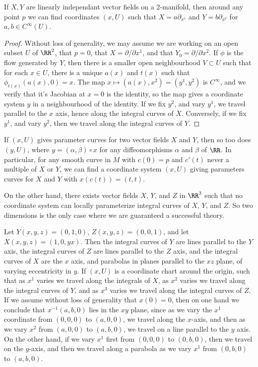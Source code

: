 \begin{theorem}
    If $X,Y$ are linearly independant vector fields on a 2-manifold, then around any point $p$ we can find coordinates $(x,U)$ such that $X = a \partial_{x^1}$ and $Y = b \partial_{x^2}$ for $a,b \in C^\infty(U)$.
\end{theorem}
\begin{proof}
    Without loss of generality, we may assume we are working on an open subset $U$ of $\RR^2$, that $p = 0$, that $X = \partial/\partial x^1$, and that $Y_0 = \partial / \partial x^2$. If $\phi$ is the flow generated by $Y$, then there is a smaller open neighbourhood $V \subset U$ such that for each $x \in U$, there is a unique $a(x)$ and $t(x)$ such that $\phi_{t(x)}(a(x),0) = x$. The map $x \mapsto (a(x),x^2) = (y^1,y^2)$ is $C^\infty$, and we verify that it's Jacobian at $x = 0$ is the identity, so the map gives a coordinate system $y$ in a neighbourhood of the identity. If we fix $y^2$, and vary $y^1$, we travel parallel to the $x$ axis, hence along the integral curves of $X$. Conversely, if we fix $y^1$, and vary $y^2$, then we travel along the integral curves of $Y$.
\end{proof}

\begin{remark}
    If $(x,U)$ gives parameter curves for two vector fields $X$ and $Y$, then so too does $(y,U)$, where $y = (\alpha,\beta) \circ x$ for any diffeomorphisms $\alpha$ and $\beta$ of $\RR$. In particular, for any smooth curve in $M$ with $c(0) = p$ and $c'(t)$ never a multiple of $X$ or $Y$, we can find a coordinate system $(x,U)$ giving parameters curves for $X$ and $Y$ with $x(c(t)) = (t,t)$.
\end{remark}

On the other hand, there exists vector fields $X$, $Y$, and $Z$ in $\RR^3$ such that no coordinate system can locally parameterize integral curves of $X$, $Y$, and $Z$. So two dimensions is the only case where we are guaranteed a successful theory.

\begin{example}
    Let $Y(x,y,z) = (0,1,0)$, $Z(x,y,z) = (0,0,1)$, and let $X(x,y,z) = (1,0,yx)$. Then the integral curves of $Y$ are lines parallel to the $Y$ axis, the integral curves of $Z$ are lines parallel to the $Z$ axis, and the integral curves of $X$ are the $x$ axis, and parabolas in planes parallel to the $xz$ plane, of varying eccentricity in $y$. If $(x,U)$ is a coordinate chart around the origin, such that as $x^1$ varies we travel along the integrals of $X$, as $x^2$ varies we travel along the integral curves of $Y$, and as $x^3$ varies we travel along the integral curves of $Z$. If we assume without loss of generality that $x(0) = 0$, then on one hand we conclude that $x^{-1}(a,b,0)$ lies in the $xy$ plane, since as we vary the $x^1$ coordinate from $(0,0,0)$ to $(a,0,0)$, we travel along the $x$-axis, and then as we vary $x^2$ from $(a,0,0)$ to $(a,b,0)$, we travel on a line parallel to the $y$ axis. On the other hand, if we vary $x^1$ first from $(0,0,0)$ to $(0,b,0)$, then we travel on the $y$-axis, and then we travel along a parabola as we vary $x^1$ from $(0,b,0)$ to $(a,b,0)$.
\end{example}

